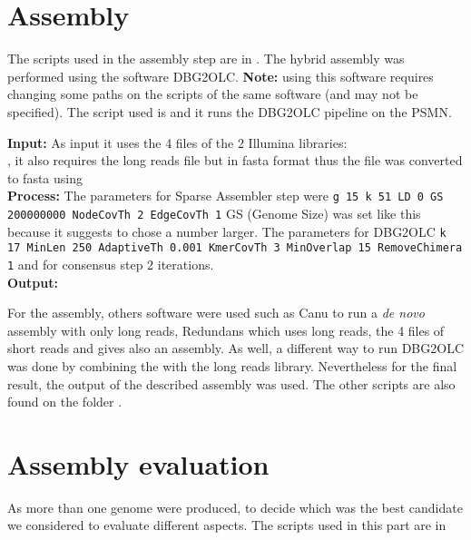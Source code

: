 \documentclass[a4paper,12pt]{article}
\begin{document}
\section{Assembly}
The scripts used in the assembly step are in .
The hybrid assembly was performed using the software DBG2OLC. \textbf{Note:} using this software requires changing some paths on the scripts of the same software (and may not be specified). The script used is  and it runs the DBG2OLC pipeline on the PSMN.

\textbf{Input: }As input it uses the 4 files of the 2 Illumina libraries: \\
 ,
it also requires the long reads file but in fasta format thus the file   was converted to fasta using \\
\textbf{Process:}
The parameters for Sparse Assembler step were \texttt{g 15 k 51 LD 0 GS 200000000 NodeCovTh 2 EdgeCovTh 1} GS (Genome Size) was set like this because it suggests to chose a number larger.
The parameters for DBG2OLC \texttt{k 17 MinLen 250 AdaptiveTh 0.001 KmerCovTh 3 MinOverlap 15 RemoveChimera 1} and for consensus step 2 iterations.\\
\textbf{Output:} 

For the assembly, others software were used such as Canu to run a \textit{de novo} assembly with only long reads, Redundans which uses long reads, the 4 files of short reads and gives also an assembly. As well, a different way to run DBG2OLC was done by combining the  with the long reads library. Nevertheless for the final result, the output of the described assembly was used. The other scripts are also found on the folder .

\section{Assembly evaluation}

As more than one genome were produced, to decide which was the best candidate we considered to evaluate different aspects. The scripts used in this part are in \\
\end{document}

